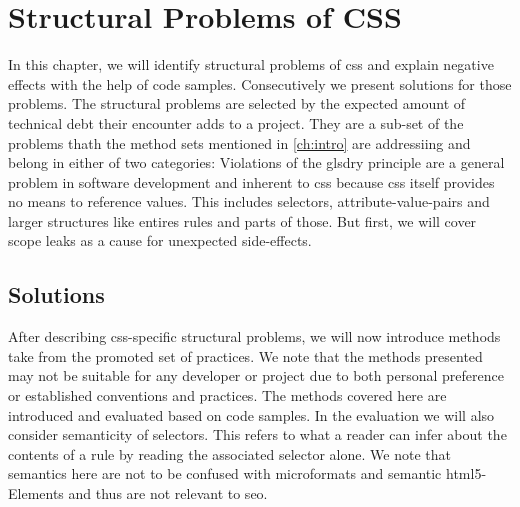 

\chapter{Structural Problems of CSS}
In this chapter, we will identify structural problems of \gls{css} and explain negative effects with the help of code samples.
Consecutively we present solutions for those problems.
The structural problems are selected by the expected amount of technical debt their encounter adds to a project.
They are a sub-set of the problems thath the method sets mentioned in \autoref{ch:intro} are addressiing and belong in either of two categories:
Violations of the gls{dry} principle are a general problem in software development and inherent to \gls{css} because \gls{css} itself provides no means to reference values.
This includes selectors, attribute-value-pairs and larger structures like entires rules and parts of those.
But first, we will cover scope leaks as a cause for unexpected side-effects.







\section{Solutions}
After describing \gls{css}-specific structural problems, we will now introduce methods take from the promoted set of practices.
We note that the methods presented may not be suitable for any developer or project due to both personal preference or established conventions and practices.
The methods covered here are introduced and evaluated based on code samples.
In the evaluation we will also consider semanticity of selectors.
This refers to what a reader can infer about the contents of a rule by reading the associated selector alone.
We note that semantics here are not to be confused with microformats and semantic \gls{html}5-Elements and thus are not relevant to \gls{seo}.




